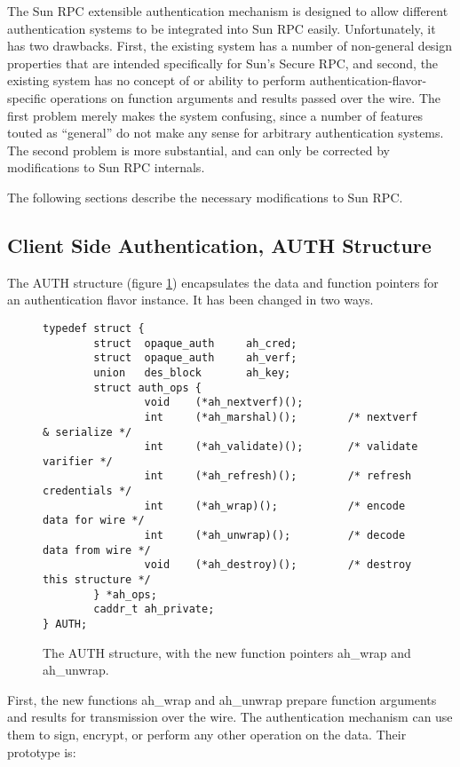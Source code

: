 The Sun RPC extensible authentication mechanism is designed to allow
different authentication systems to be integrated into Sun RPC easily.
Unfortunately, it has two drawbacks.  First, the existing system has a
number of non-general design properties that are intended specifically
for Sun's Secure RPC, and second, the existing system has no concept
of or ability to perform authentication-flavor-specific operations on
function arguments and results passed over the wire.  The first
problem merely makes the system confusing, since a number of features
touted as ``general'' do not make any sense for arbitrary
authentication systems.  The second problem is more substantial, and
can only be corrected by modifications to Sun RPC internals.

The following sections describe the necessary modifications to Sun
RPC.

\subsection{Client Side Authentication, AUTH Structure}

The AUTH structure (figure \ref{fig:auth}) encapsulates the data and
function pointers for an authentication flavor instance.  It has been
changed in two ways.

\begin{figure}[htbp]
\begin{verbatim}
typedef struct {
        struct  opaque_auth     ah_cred;
        struct  opaque_auth     ah_verf;
        union   des_block       ah_key;
        struct auth_ops {
                void    (*ah_nextverf)();
                int     (*ah_marshal)();        /* nextverf & serialize */
                int     (*ah_validate)();       /* validate varifier */
                int     (*ah_refresh)();        /* refresh credentials */
                int     (*ah_wrap)();           /* encode data for wire */
                int     (*ah_unwrap)();         /* decode data from wire */
                void    (*ah_destroy)();        /* destroy this structure */
        } *ah_ops;
        caddr_t ah_private;
} AUTH;
\end{verbatim}
\caption{The AUTH structure, with the new function pointers ah_wrap
and ah_unwrap.}
\label{fig:auth}
\end{figure}

First, the new functions ah_wrap and ah_unwrap prepare function
arguments and results for transmission over the wire.  The
authentication mechanism can use them to sign, encrypt, or perform any
other operation on the data.  Their prototype is:

